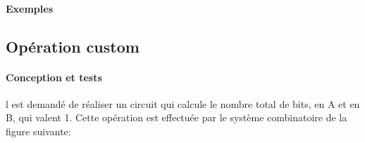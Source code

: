 \documentclass[a4paper]{article}
\begin{document}
\paragraph{Exemples}


\subsection{Opération custom}
\label{custom}

\paragraph{Conception et tests}
l est demandé de réaliser un circuit qui calcule le nombre total de bits, en A et en B, qui valent 1. Cette opération est effectuée par le système combinatoire de la figure suivante:
\end{document}
